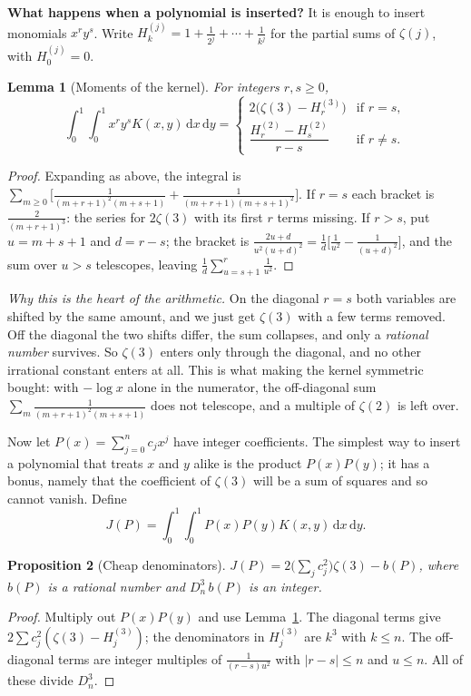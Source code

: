 \documentclass[11pt]{article}
\newcommand{\dd}{\,\mathrm d}
\newtheorem{lemma}{Lemma}
\newtheorem{proposition}[lemma]{Proposition}
\theoremstyle{remark}
\newcommand{\q}[1]{\medskip\noindent\textbf{#1}}
\begin{document}
\q{What happens when a polynomial is inserted?} It is enough to insert monomials $x^ry^s$. Write
$H_k^{(j)}=1+\frac1{2^j}+\cdots+\frac1{k^j}$ for the partial sums of $\zeta(j)$, with $H_0^{(j)}=0$.

\begin{lemma}[Moments of the kernel]\label{lem:moments}
For integers $r,s\ge0$,
\[
\int_0^1\!\!\int_0^1x^ry^sK(x,y)\dd x\dd y=
\begin{cases}
2\bigl(\zeta(3)-H_r^{(3)}\bigr)&\text{if }r=s,\\[3pt]
\dfrac{H_r^{(2)}-H_s^{(2)}}{r-s}&\text{if }r\ne s.
\end{cases}
\]
\end{lemma}
\begin{proof}
Expanding as above, the integral is $\sum_{m\ge0}\bigl[\frac1{(m+r+1)^2(m+s+1)}+
\frac1{(m+r+1)(m+s+1)^2}\bigr]$.
If $r=s$ each bracket is $\frac2{(m+r+1)^3}$: the series for $2\zeta(3)$ with its first $r$ terms
missing. If $r>s$, put $u=m+s+1$ and $d=r-s$; the bracket is
$\frac{2u+d}{u^2(u+d)^2}=\frac1d\bigl[\frac1{u^2}-\frac1{(u+d)^2}\bigr]$, and the sum over $u>s$
telescopes, leaving $\frac1d\sum_{u=s+1}^{r}\frac1{u^2}$.
\end{proof}
\noindent\emph{Why this is the heart of the arithmetic.} On the diagonal $r=s$ both variables are
shifted by the same amount, and we just get $\zeta(3)$ with a few terms removed. Off the diagonal
the two shifts differ, the sum collapses, and only a \emph{rational number} survives. So $\zeta(3)$
enters only through the diagonal, and no other irrational constant enters at all. This is what
making the kernel symmetric bought: with $-\log x$ alone in the numerator, the off-diagonal sum
$\sum_m\frac1{(m+r+1)^2(m+s+1)}$ does not telescope, and a multiple of $\zeta(2)$ is left over.

Now let $P(x)=\sum_{j=0}^nc_jx^j$ have integer coefficients. The simplest way to insert a
polynomial that treats $x$ and $y$ alike is the product $P(x)P(y)$; it has a bonus, namely that
the coefficient of $\zeta(3)$ will be a sum of squares and so cannot vanish. Define
\[
J(P)=\int_0^1\!\!\int_0^1P(x)P(y)K(x,y)\dd x\dd y .
\]
\begin{proposition}[Cheap denominators]\label{prop:arith}
$J(P)=2\bigl(\sum_jc_j^2\bigr)\zeta(3)-b(P)$, where $b(P)$ is a rational number and
$D_n^3\,b(P)$ is an integer.
\end{proposition}
\begin{proof}
Multiply out $P(x)P(y)$ and use Lemma~\ref{lem:moments}. The diagonal terms give
$2\sum c_j^2(\zeta(3)-H_j^{(3)})$; the denominators in $H_j^{(3)}$ are $k^3$ with $k\le n$. The
off-diagonal terms are integer multiples of $\frac1{(r-s)u^2}$ with $|r-s|\le n$ and $u\le n$.
All of these divide $D_n^3$.
\end{proof}
\end{document}
